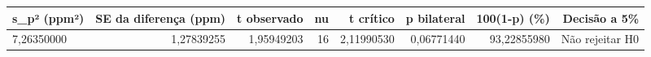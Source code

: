 \begin{tabular}{lrrrrrrr}
\toprule
s\_p² (ppm²) & SE da diferença (ppm) & t observado & nu & t crítico & p bilateral & 100(1-p) (\%) & Decisão a 5\% \\
\midrule
7,26350000 & 1,27839255 & 1,95949203 & 16 & 2,11990530 & 0,06771440 & 93,22855980 & Não rejeitar H0 \\
\bottomrule
\end{tabular}
